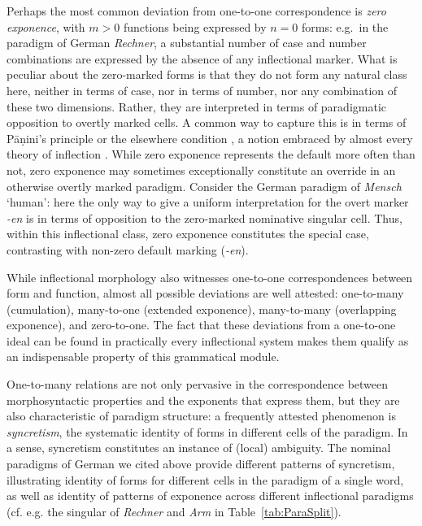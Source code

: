 \documentclass[output=paper]{langscibook}
\begin{document}
Perhaps the most common deviation from one-to-one correspondence is
\emph{zero exponence}, with $m>0$ functions being expressed by $n=0$ forms:
e.g.\ in the paradigm of German \textit{Rechner}, a substantial number
of case and number combinations are expressed by the absence of any
inflectional marker. What is peculiar about the zero-marked forms is
that they do not form any natural class here, neither in terms of
case, nor in terms of number, nor any combination of these two
dimensions. Rather, they are interpreted in terms of paradigmatic
opposition to overtly marked cells. A common way to capture this is in
terms of Pāṇini's principle or the elsewhere condition
\citep{kiparsky_p85}, a notion embraced by almost every theory of
inflection
\citep[cf.][]{Halle93,Prince93,Anderson92,Stump01,Crysmann:Bonami:2016}.
While zero exponence represents the default more often than not, zero
exponence may sometimes exceptionally constitute an override in an
otherwise overtly marked paradigm.  Consider the German paradigm of
\textit{Mensch} `human': here the only way to give a uniform
interpretation for the overt marker \textit{-en} is in terms of
opposition to the zero-marked nominative singular cell. Thus, within
this inflectional class, zero exponence constitutes the special case,
contrasting with non-zero default marking (\textit{-en}).

While inflectional morphology also witnesses one-to-one
correspondences between form and function, almost all possible
deviations are well attested: one-to-many (cumulation), many-to-one
(extended exponence), many-to-many (overlapping exponence), and
zero-to-one. The fact that these deviations from a one-to-one ideal can
be found in practically every inflectional system makes them qualify
as an indispensable property of this grammatical module.  

 One-to-many relations are not only pervasive in the
correspondence between morphosyntactic properties and the exponents
that express them, but they are also characteristic of paradigm
structure: a frequently attested phenomenon is \emph{syncretism}, the
systematic identity of forms in different cells of the paradigm. In a
sense, syncretism constitutes an instance of (local) ambiguity. The
nominal paradigms of German we cited above provide different patterns
of syncretism, illustrating identity of forms for different
cells in the paradigm of a single word, as well as identity of
patterns of exponence across different inflectional paradigms
(cf. e.g. the singular of \textit{Rechner} and \textit{Arm} in
Table~\ref{tab:ParaSplit}).
\end{document}
